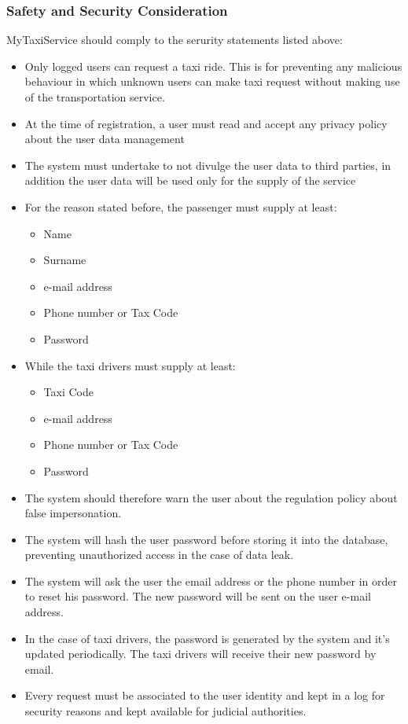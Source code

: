 \documentclass[11pt, a4paper,titlepage]{article}
\newcommand{\productname}{MyTaxiService }
\begin{document}
\subsubsection{Safety and Security Consideration}
\productname should comply to the serurity statements listed above: \newline
\begin{itemize}
	\item Only logged users can request a taxi ride. This is for preventing any malicious behaviour in which unknown users can make taxi request without making use of the transportation service.
	\item At the time of registration, a user must read and accept any privacy policy about the user data management
	\item The system must undertake to not divulge the user data to third parties, in addition the user data will be used only for the supply of the service
	\item For the reason stated before, the passenger must supply at least:
		\begin{itemize}
			\item Name
			\item Surname
			\item e-mail address
			\item Phone number or Tax Code
			\item Password
		\end{itemize}
		\item While the taxi drivers must supply at least:
		\begin{itemize}
			\item Taxi Code
			\item e-mail address
			\item Phone number or Tax Code
			\item Password
		\end{itemize}
	\item The system should therefore warn the user about the regulation policy about false impersonation.
	\item The system will hash the user password before storing it into the database, preventing unauthorized access in the case of data leak.
	\item The system will ask the user the email address or the phone number in order to reset his password. The new password will be sent on the user e-mail address.
	\item In the case of taxi drivers, the password is generated by the system and it's updated periodically. The taxi drivers will receive their new password by email.
	\item Every request must be associated to the user identity and kept in a log for security reasons and kept available for  judicial authorities.
\end{itemize}
\end{document}
